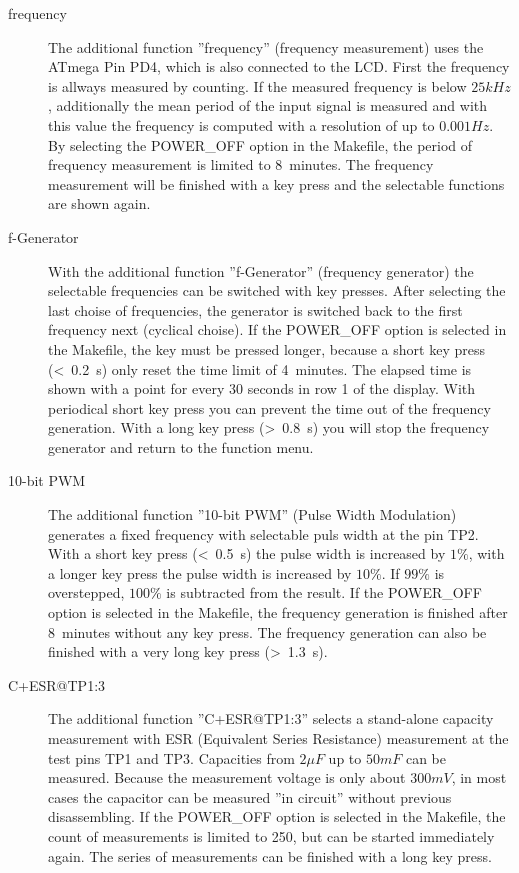 \begin{description}
 \item[frequency]
The additional function ''frequency'' (frequency measurement) uses the ATmega Pin PD4, which is also connected to the LCD.
First the frequency is allways measured by counting.
If the measured frequency is below \(25 kHz\), additionally the mean period of the input signal
is measured and with this value the frequency is computed with a resolution of up to \(0.001 Hz\).
By selecting the POWER\_OFF option in the Makefile, the period of frequency measurement is limited to 8~minutes.
The frequency measurement will be finished with a key press and the selectable functions are shown again.\\

 \item[f-Generator]
With the additional function ''f-Generator'' (frequency generator) the selectable frequencies can be switched with key presses.
After selecting the last choise of frequencies, the generator is switched back to
the first frequency next (cyclical choise).
If the POWER\_OFF option is selected in the Makefile, the key must be pressed longer, because a
short key press (\textless~0.2~s) only reset the time limit of 4~minutes.
The elapsed time is shown with a point for every 30 seconds in row 1 of the display.
With periodical short key press you can prevent the time out of the frequency generation.
With a long key press (\textgreater~0.8~s) you will stop the frequency generator and return to the function menu.\\

\item[10-bit PWM]
The additional function ''10-bit PWM'' (Pulse Width Modulation) generates a fixed frequency with selectable
puls width at the pin TP2.
With a short key press (\textless~0.5~s) the pulse width is increased by \(1 \%\), with a longer key press the pulse width
is increased by \(10 \%\).
If \(99 \%\) is overstepped, \(100 \%\) is subtracted from the result.
If the POWER\_OFF option is selected in the Makefile, the frequency generation is finished after 8~minutes without any key press.
The frequency generation can also be finished with a very long key press (\textgreater~1.3~s).\\

\item[C+ESR@TP1:3]
The additional function ''C+ESR@TP1:3'' selects a stand-alone capacity measurement with 
ESR (Equivalent Series Resistance) measurement at the test pins TP1 and TP3. 
Capacities from \(2 \mu F\) up to \(50 mF\) can be measured. 
Because the measurement voltage is only about \(300 mV\), in most cases the capacitor can be
measured ''in circuit'' without previous disassembling.
If the POWER\_OFF option is selected in the Makefile, the count of measurements is limited
to 250, but can be started immediately again.
The series of measurements can be finished with a long key press.\\


\end{description}
